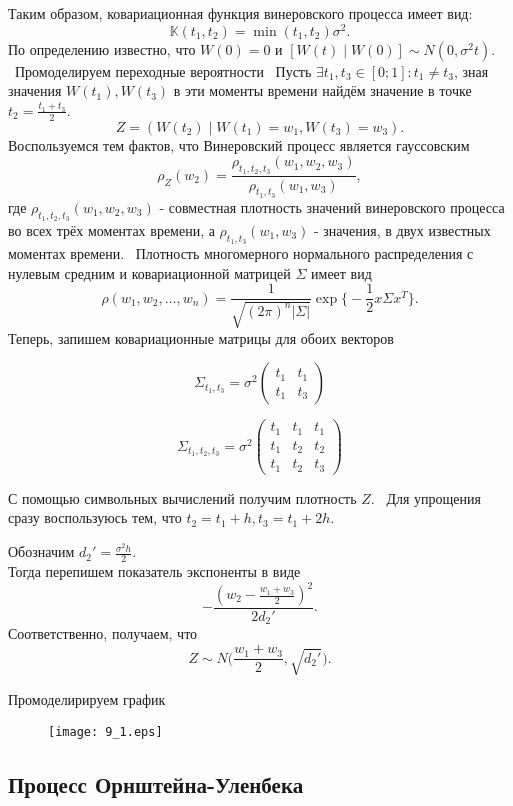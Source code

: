 \documentclass[11pt]{article}
\begin{document}
Таким образом, ковариационная функция винеровского процесса имеет вид:
$$
    \mathbb{K}(t_1, t_2) = \min(t_1, t_2)\sigma^2.
$$
По определению известно, что $W(0) = 0$ и $[W(t) \mid W(0)] \sim N(0, \sigma^2t)$. \
Промоделируем переходные вероятности \
Пусть $\exists t_1, t_3 \in [0;1] : t_1 \ne t_3$, зная значения $W(t_1), W(t_3)$ в эти моменты времени найдём значение в точке $t_2 = \frac{t_1 + t_3}{2}$. 
$$
    Z = (W(t_2) \mid W(t_1)=w_1, W(t_3) = w_3).
$$
Воспользуемся тем фактов, что Винеровский процесс является гауссовским
$$
    \rho_Z(w_2) = \frac{\rho_{t_1,t_2,t_3}(w_1, w_2, w_3)}{\rho_{t_1, t_3}(w_1, w_3)},
$$
где $\rho_{t_1, t_2, t_3}(w_1, w_2, w_3)$ - совместная плотность значений винеровского процесса во всех трёх моментах времени, а $\rho_{t_1, t_3}(w_1, w_3)$ - значения, в двух известных моментах времени. \
Плотность многомерного нормального распределения с нулевым средним и ковариационной матрицей $\Sigma$ имеет вид
$$
    \rho(w_1, w_2, \dots, w_n) = \frac{1}{\sqrt{(2\pi)^n |\Sigma|}} \exp \Big\{- \frac{1}{2} x\Sigma x^T\Big\}.
$$
Теперь, запишем ковариационные матрицы для обоих векторов

$$
\Sigma_{t_1,t_3} = \sigma^2
\begin{pmatrix}
t_1 & t_1 \\
t_1 & t_3
\end{pmatrix}
$$

$$
\Sigma_{t_1,t_2, t_3} = \sigma^2
\begin{pmatrix}
t_1 & t_1 & t_1 \\
t_1 & t_2 & t_2 \\
t_1 & t_2 & t_3
\end{pmatrix}
$$

С помощью символьных вычислений получим плотность $Z$. \
Для упрощения сразу воспользуюсь тем, что $t_2 = t_1 + h, t_3 = t_1 + 2h$.  

Обозначим $ {d_2'} = \frac{\sigma^2 h}{2}$. \\
Тогда перепишем показатель экспоненты в виде
$$
    - \frac{(w_2 - \frac{w_1 + w_3}{2}) ^ 2}{2d_2'}.
$$
Соответственно, получаем, что
$$
    Z \sim N \Big(\frac{w_1 + w_3}{2}, \sqrt{d_2'} \Big).
$$

Промоделирируем график

\begin{figure}[ht]
    \texttt{[image: 9\_1.eps]} 
    \caption{}
\end{figure} 
\FloatBarrier

\subsection{Процесс Орнштейна-Уленбека}
\end{document}
